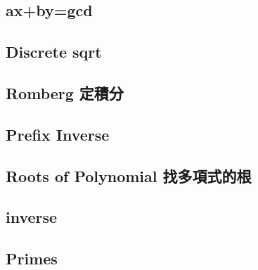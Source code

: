 \documentclass[a4paper,10pt,twocolumn,oneside]{article}
\begin{document}
\subsection{ax+by=gcd}


\subsection{Discrete sqrt}


% 

\subsection{Romberg 定積分}


%

\subsection{Prefix Inverse}


\subsection{Roots of Polynomial 找多項式的根}


\subsection{inverse}


%

\subsection{Primes}

\end{document}
